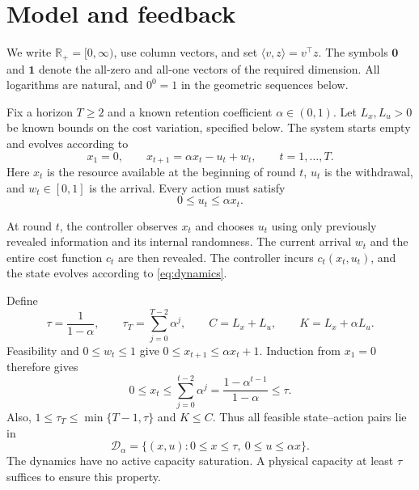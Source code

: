 \documentclass[11pt]{article}
\newcommand{\R}{\mathbb R}
\begin{document}
\section{Model and feedback}
\label{sec:model}

We write $\R_+=[0,\infty)$, use column vectors, and set
$\langle v,z\rangle=v^\top z$. The symbols $\mathbf0$ and
$\mathbf1$ denote the all-zero and all-one vectors of the required
dimension. All logarithms are natural, and $0^0=1$ in the
geometric sequences below.

Fix a horizon $T\ge2$ and a known retention coefficient
$\alpha\in(0,1)$. Let $L_x,L_u>0$ be known bounds on the cost
variation, specified below. The system starts empty and evolves according to
\begin{equation}
\label{eq:dynamics}
x_1=0,
\qquad
x_{t+1}=\alpha x_t-u_t+w_t,
\qquad t=1,\ldots,T.
\end{equation}
Here $x_t$ is the resource available at the beginning of round $t$,
$u_t$ is the withdrawal, and $w_t\in[0,1]$ is the arrival.
Every action must satisfy
\begin{equation}
\label{eq:feasibility}
0\le u_t\le\alpha x_t.
\end{equation}

At round $t$, the controller observes $x_t$ and chooses $u_t$
using only previously revealed information and its internal
randomness. The current arrival $w_t$ and the entire cost function
$c_t$ are then revealed. The controller incurs $c_t(x_t,u_t)$,
and the state evolves according to \eqref{eq:dynamics}.

Define
\begin{equation}
\label{eq:constants}
\tau=\frac{1}{1-\alpha},
\qquad
\tau_T=\sum_{j=0}^{T-2}\alpha^j,
\qquad
C=L_x+L_u,
\qquad
K=L_x+\alpha L_u.
\end{equation}
Feasibility and $0\le w_t\le1$ give
$0\le x_{t+1}\le\alpha x_t+1$. Induction from $x_1=0$ therefore gives
\[
0\le x_t\le\sum_{j=0}^{t-2}\alpha^j
=\frac{1-\alpha^{t-1}}{1-\alpha}\le\tau.
\]
Also, $1\le\tau_T\le\min\{T-1,\tau\}$ and $K\le C$.
Thus all feasible state--action pairs lie in
\[
\mathcal D_\alpha
=
\{(x,u):0\le x\le\tau,\ 0\le u\le\alpha x\}.
\]
The dynamics have no active capacity saturation. A physical capacity
at least $\tau$ suffices to ensure this property.
\end{document}

